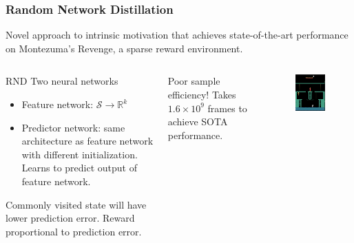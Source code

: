 \documentclass{beamer}
\begin{document}
\begin{frame}
  \frametitle{Random Network Distillation}
  Novel approach to intrinsic motivation that achieves state-of-the-art performance on Montezuma's Revenge, a sparse reward environment.
  \begin{columns}
    \begin{alertblock}{RND}
      Two neural networks
      \begin{itemize}
        \item Feature network: $\mathcal{S} \to \mathbb{R}^k$
        \item Predictor network: same architecture as feature network with different initialization. Learns to predict output of feature network.
      \end{itemize}
      Commonly visited state will have lower prediction error. Reward proportional to prediction error.
    \end{alertblock}
    Poor sample efficiency! Takes $1.6 \times 10^9$ frames to achieve SOTA performance.
    \begin{figure}
      \includegraphics{assets/mr.png}
    \end{figure}
  \end{columns}
\end{frame}
\end{document}
